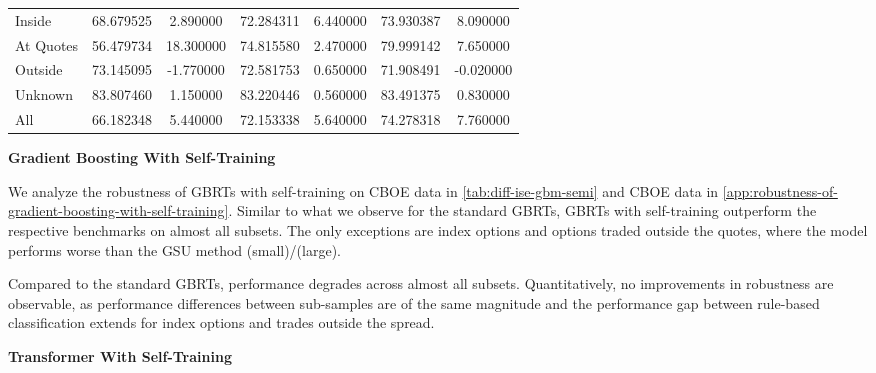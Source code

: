 \begin{table}[h!]
\begin{tabular}{lSSSSSS@{}}
        \tabindent Inside           & 68.679525                                        & 2.890000                                              & 72.284311                                     & 6.440000 & 73.930387    & 8.090000  \\
        \tabindent At Quotes        & 56.479734                                        & 18.300000                                             & 74.815580                                     & 2.470000 & 79.999142    & 7.650000  \\
        \tabindent Outside          & 73.145095                                        & -1.770000                                             & 72.581753                                     & 0.650000 & 71.908491    & -0.020000 \\
        \tabindent Unknown          & 83.807460                                        & 1.150000                                              & 83.220446                                     & 0.560000 & 83.491375    & 0.830000  \\
        \cmidrule(rl){1-7}
 All              & 66.182348                                        & 5.440000                                              & 72.153338                                     & 5.640000 & 74.278318    & 7.760000  \\
        \bottomrule
    \end{tabular}
\end{table}

\clearpage

\textbf{Gradient Boosting With Self-Training}

We analyze the robustness of \glspl{GBRT} with self-training on \gls{CBOE} data in \cref{tab:diff-ise-gbm-semi} and \gls{CBOE} data in \cref{app:robustness-of-gradient-boosting-with-self-training}. Similar to what we observe for the standard \glspl{GBRT}, \glspl{GBRT} with self-training outperform the respective benchmarks on almost all subsets. The only exceptions are index options and options traded outside the quotes, where the model performs worse than the \gls{GSU} method (small)/(large).

Compared to the standard \glspl{GBRT}, performance degrades across almost all subsets. Quantitatively, no improvements in robustness are observable, as performance differences between sub-samples are of the same magnitude and the performance gap between rule-based classification extends for index options and trades outside the spread.

\textbf{Transformer With Self-Training}

